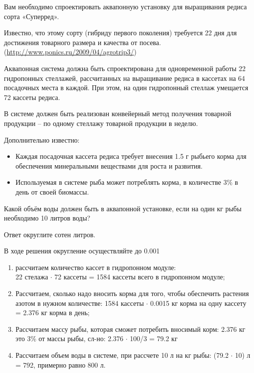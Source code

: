 
Вам необходимо спроектировать аквапонную установку для выращивания редиса сорта  «Суперред».

Известно, что этому сорту (гибриду первого поколения) требуется  22 дня  для достижения товарного размера и качества от посева.  (\url{http://www.ponics.ru/2009/04/agrotrip3/})

Аквапонная система должна быть спроектирована для одновременной работы 22 гидропонных стеллажей, рассчитанных на выращивание редиса в кассетах на 64 посадочных места в каждой. При этом, на один гидропонный стеллаж умещается 72 кассеты редиса.

В системе должен быть реализован конвейерный метод получения товарной продукции – по одному стеллажу товарной продукции в неделю.

Дополнительно известно:

\begin{itemize}
    \item Каждая посадочная кассета редиса требует внесения  1.5 г рыбьего корма для обеспечения минеральными веществами для роста и развития.
    \item Используемая в системе рыба может потреблять корма, в количестве $3\%$ в день от своей биомассы.
\end{itemize}

Какой объём воды должен быть в аквапонной установке, если на один кг рыбы необходимо 10 литров воды?

Ответ округлите сотен литров.

В ходе решения округление осуществляйте до 0.001

\solutionSection

\begin{enumerate}
    \item рассчитаем количество кассет в гидропонном модуле: \\
    22 стелажа $\cdot$ 72 кассеты = 1584 кассеты всего в гидропонном модуле;
    \item Рассчитаем, сколько надо вносить корма для того, чтобы обеспечить растения азотом в нужном количестве:
    1584 кассеты $\cdot$  0.0015 кг корма на одну кассету = 2.376 кг корма в день;
    \item Рассчитаем массу рыбы, которая сможет потребить вносимый корм:
    2.376 кг это 3\% от массы рыбы, сл-но: 2.376 $\cdot$ 100/3 = 79.2 кг
    \item Рассчитаем объем воды в системе, при рассчете 10 л на кг рыбы: 
    (79.2 $\cdot$ 10) л = 792, примерно равно 800 л.
\end{enumerate}
